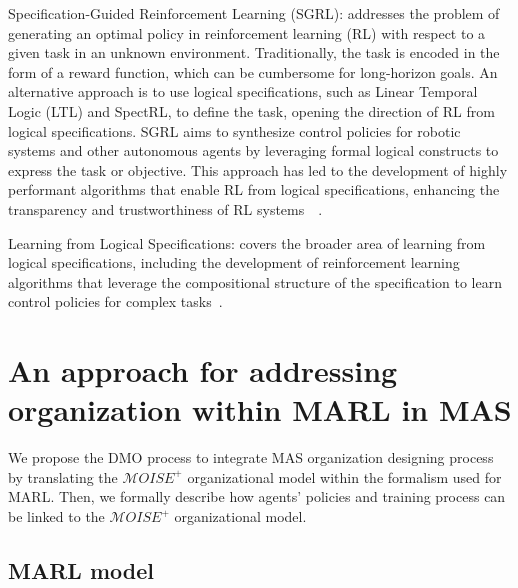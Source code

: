 \documentclass[runningheads]{llncs}
\begin{document}
Specification-Guided Reinforcement Learning (SGRL): addresses the problem of generating an optimal policy in reinforcement learning (RL) with respect to a given task in an unknown environment. Traditionally, the task is encoded in the form of a reward function, which can be cumbersome for long-horizon goals. An alternative approach is to use logical specifications, such as Linear Temporal Logic (LTL) and SpectRL, to define the task, opening the direction of RL from logical specifications. SGRL aims to synthesize control policies for robotic systems and other autonomous agents by leveraging formal logical constructs to express the task or objective. This approach has led to the development of highly performant algorithms that enable RL from logical specifications, enhancing the transparency and trustworthiness of RL systems~\cite{Bansal2022}~\cite{Jothimurugan2023}.

Learning from Logical Specifications: covers the broader area of learning from logical specifications, including the development of reinforcement learning algorithms that leverage the compositional structure of the specification to learn control policies for complex tasks~\cite{Jothimurugan2021}.

\section{An approach for addressing organization within MARL in MAS}



We propose the DMO process to integrate MAS organization designing process by translating the $\mathcal{M}OISE^{+}$ organizational model within the formalism used for MARL. Then, we formally describe how agents' policies and training process can be linked to the $\mathcal{M}OISE^{+}$ organizational model.

\subsection{MARL model}
\end{document}
